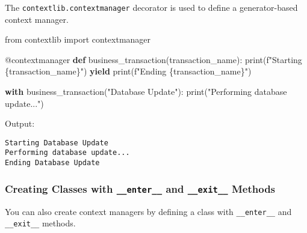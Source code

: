 \documentclass[
  letterpaper,
  DIV=11,
  numbers=noendperiod]{scrreprt}
\newenvironment{Shaded}{\begin{snugshade}}{\end{snugshade}}
\newcommand{\AttributeTok}[1]{\textcolor[rgb]{0.40,0.45,0.13}{#1}}
\newcommand{\BuiltInTok}[1]{\textcolor[rgb]{0.00,0.23,0.31}{#1}}
\newcommand{\ControlFlowTok}[1]{\textcolor[rgb]{0.00,0.23,0.31}{\textbf{#1}}}
\newcommand{\ImportTok}[1]{\textcolor[rgb]{0.00,0.46,0.62}{#1}}
\newcommand{\KeywordTok}[1]{\textcolor[rgb]{0.00,0.23,0.31}{\textbf{#1}}}
\newcommand{\NormalTok}[1]{\textcolor[rgb]{0.00,0.23,0.31}{#1}}
\newcommand{\SpecialCharTok}[1]{\textcolor[rgb]{0.37,0.37,0.37}{#1}}
\newcommand{\SpecialStringTok}[1]{\textcolor[rgb]{0.13,0.47,0.30}{#1}}
\newcommand{\StringTok}[1]{\textcolor[rgb]{0.13,0.47,0.30}{#1}}
\begin{document}
The \texttt{contextlib.contextmanager} decorator is used to define a
generator-based context manager.

\begin{Shaded}
\begin{Highlighting}[]
\ImportTok{from}\NormalTok{ contextlib }\ImportTok{import}\NormalTok{ contextmanager}

\AttributeTok{@contextmanager}
\KeywordTok{def}\NormalTok{ business\_transaction(transaction\_name):}
    \BuiltInTok{print}\NormalTok{(}\SpecialStringTok{f"Starting }\SpecialCharTok{\{}\NormalTok{transaction\_name}\SpecialCharTok{\}}\SpecialStringTok{"}\NormalTok{)}
    \ControlFlowTok{yield}
    \BuiltInTok{print}\NormalTok{(}\SpecialStringTok{f"Ending }\SpecialCharTok{\{}\NormalTok{transaction\_name}\SpecialCharTok{\}}\SpecialStringTok{"}\NormalTok{)}

\ControlFlowTok{with}\NormalTok{ business\_transaction(}\StringTok{"Database Update"}\NormalTok{):}
    \BuiltInTok{print}\NormalTok{(}\StringTok{"Performing database update..."}\NormalTok{)}
\end{Highlighting}
\end{Shaded}

Output:

\begin{verbatim}
Starting Database Update
Performing database update...
Ending Database Update
\end{verbatim}

\subsubsection{\texorpdfstring{Creating Classes with
\texttt{\_\_enter\_\_} and \texttt{\_\_exit\_\_}
Methods}{Creating Classes with \_\_enter\_\_ and \_\_exit\_\_ Methods}}\label{creating-classes-with-__enter__-and-__exit__-methods}

You can also create context managers by defining a class with
\texttt{\_\_enter\_\_} and \texttt{\_\_exit\_\_} methods.
\end{document}

